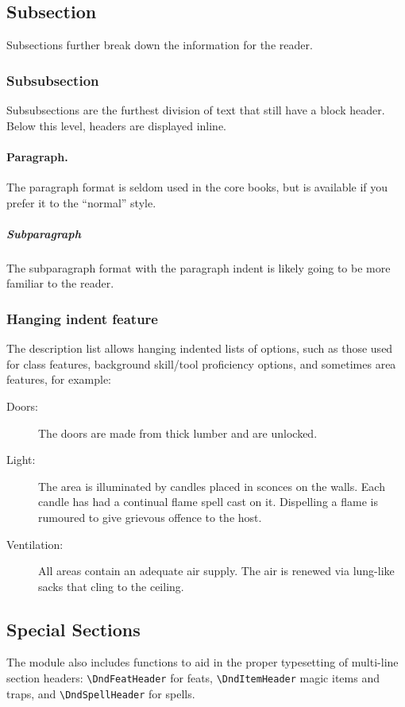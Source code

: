 \documentclass[10pt,twoside,twocolumn,openany,bg=full,notitlepage,nodeprecatedcode]{dndarticle}
\begin{document}
\subsection{Subsection}
\label{sec:org012210c}
Subsections further break down the information for the reader.
\subsubsection{Subsubsection}
\label{sec:orgdbc1fc3}
Subsubsections are the furthest division of text that still have a block header. Below this level, headers are displayed
inline.
\paragraph{Paragraph.}
\label{sec:org90f00cd}
The paragraph format is seldom used in the core books, but is available if you prefer it to the “normal” style.
\subparagraph{Subparagraph}
\label{sec:org87170c0}
The subparagraph format with the paragraph indent is likely going to be more familiar to the reader.
\subsubsection{Hanging indent feature}
\label{sec:org5994fea}
The description list allows hanging indented lists of options, such as those used for class features, background
skill/tool proficiency options, and sometimes area features, for example:
\begin{description}
\item[{Doors:}] The doors are made from thick lumber and are unlocked.
\item[{Light:}] The area is illuminated by candles placed in sconces on the walls. Each candle has had a continual flame spell cast on it. Dispelling a flame is rumoured to give grievous offence to the host.
\item[{Ventilation:}] All areas contain an adequate air supply. The air is renewed via lung-like sacks that cling to the ceiling.
\end{description}
\subsection{Special Sections}
\label{sec:orgf82b178}
The module also includes functions to aid in the proper typesetting of multi-line section headers: \texttt{\textbackslash{}DndFeatHeader} for feats, \texttt{\textbackslash{}DndItemHeader} magic items and traps, and \texttt{\textbackslash{}DndSpellHeader} for spells.
\end{document}
